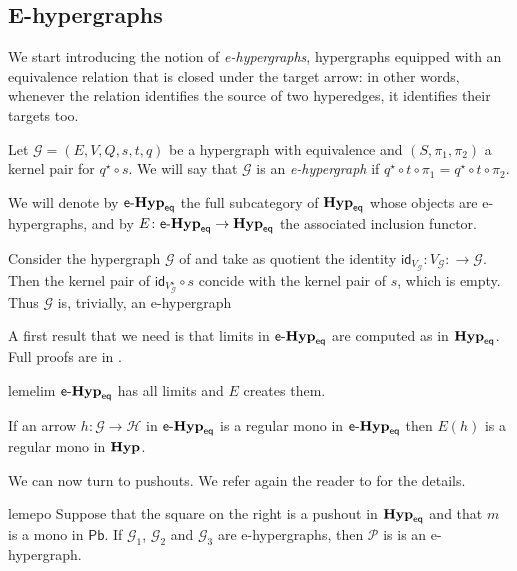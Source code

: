 \documentclass[3p]{elsarticle}
\newcommand{\pbc}{\mathsf{Pb}}
\newcommand{\eq}{\mathsf{eq}}
\newcommand{\catname}[1]{\textbf{\textup{#1}}}
\newcommand{\hyp}{\catname{Hyp}}
\newcommand{\EqHyp}{\catname{Hyp}_{\mathsf{eq}}} %
\newcommand{\egg}{\mathsf{e}\text{-}\catname{Hyp}_\eq}
\newcommand{\id}[1]{\mathsf{id}_{#1}}
\theoremstyle{remark}
\theoremstyle{definition}
\begin{document}
\subsection{E-hypergraphs}

We start introducing the notion of \emph{e-hypergraphs}, hypergraphs equipped with an equivalence relation that is closed under the target arrow:
in other words, whenever the relation identifies the source of two hyperedges, it identifies their targets too.

\begin{defi}
	Let $\mathcal{G} = (E, V, Q, s, t, q)$ be a hypergraph with equivalence and $(S, \pi_1, \pi_2)$ a kernel pair for $q^\star \circ s$.
	We will say that $\mathcal{G}$ is an \emph{e-hypergraph} if $q^\star \circ t \circ \pi_1 = q^\star \circ t \circ \pi_2$.
	
	We will denote by $\egg$ the full subcategory of $\EqHyp$ whose objects are e-hypergraphs, and by $E\colon \egg \to \EqHyp$ the associated inclusion functor.
\end{defi}


\begin{exa}
	Consider the hypergraph $\mathcal{G}$ of  and take as quotient the identity $\id{V_\mathcal{G}}\colon V_\mathcal{G}\colon \to\mathcal{G}$. Then the kernel pair of $\id{V^\star_\mathcal{G}} \circ s$ concide with the kernel pair of $s$, which is empty. Thus  $\mathcal{G}$ is, trivially, an e-hypergraph
\end{exa}

A first result that we need is that limits in $\egg$ are computed as in $\EqHyp$. Full proofs are in .

\begin{restatable}{lem}{elim}\label{lem:elim}
	$\egg$ has all limits and $E$ creates them.
\end{restatable}


\begin{cor}\label{cor:ereg}
	If an arrow $h: \mathcal{G \to H}$ in $\egg$ is a regular mono in $\egg$ then $E(h)$ is a regular mono in $\hyp$. 
\end{cor}

We can now turn to pushouts. We refer again the reader to  for the details.

\noindent
\begin{minipage}[l]{.83\linewidth}
	\begin{restatable}{lem}{epo}\label{lem:epo}
		Suppose that the square on the right is a pushout in $\EqHyp$ and that $m$ is a mono in $\pbc$. If $\mathcal{G}_1$, $\mathcal{G}_2$ and $\mathcal{G}_3$ are e-hypergraphs, then $\mathcal{P}$ is 
		is an e-hypergraph.
	\end{restatable}
\end{minipage}\hfill 
\begin{minipage}[r]{.15\linewidth}
\end{minipage}
\end{document}
